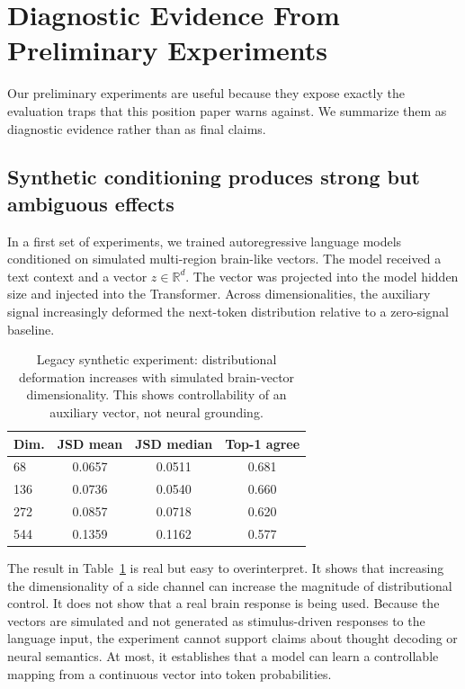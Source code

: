 \documentclass{article}
\begin{document}
\section{Diagnostic Evidence From Preliminary Experiments}

Our preliminary experiments are useful because they expose exactly the evaluation traps that this position paper warns against.
We summarize them as diagnostic evidence rather than as final claims.

\subsection{Synthetic conditioning produces strong but ambiguous effects}

In a first set of experiments, we trained autoregressive language models conditioned on simulated multi-region brain-like vectors.
The model received a text context and a vector $z \in \mathbb{R}^d$.
The vector was projected into the model hidden size and injected into the Transformer.
Across dimensionalities, the auxiliary signal increasingly deformed the next-token distribution relative to a zero-signal baseline.

\begin{table}[t]
\centering
\caption{Legacy synthetic experiment: distributional deformation increases with simulated brain-vector dimensionality. This shows controllability of an auxiliary vector, not neural grounding.}
\label{tab:synthetic_dim}
\begin{tabular}{lccc}
\toprule
Dim. & JSD mean & JSD median & Top-1 agree \\
\midrule
68  & 0.0657 & 0.0511 & 0.681 \\
136 & 0.0736 & 0.0540 & 0.660 \\
272 & 0.0857 & 0.0718 & 0.620 \\
544 & 0.1359 & 0.1162 & 0.577 \\
\bottomrule
\end{tabular}
\end{table}

The result in Table~\ref{tab:synthetic_dim} is real but easy to overinterpret.
It shows that increasing the dimensionality of a side channel can increase the magnitude of distributional control.
It does not show that a real brain response is being used.
Because the vectors are simulated and not generated as stimulus-driven responses to the language input, the experiment cannot support claims about thought decoding or neural semantics.
At most, it establishes that a model can learn a controllable mapping from a continuous vector into token probabilities.
\end{document}
